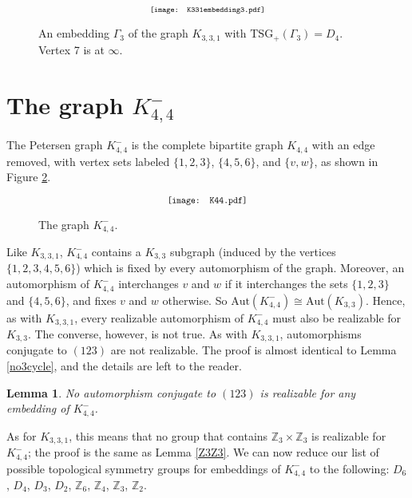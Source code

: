 \documentclass[11]{amsart}
\def\Z{\mathbb{Z}}
\def\TSG{{\mathrm{TSG}}}
\def\Aut{{\mathrm{Aut}}}
\newtheorem{lemma}[theorem]{Lemma}
\theoremstyle{definition}
\theoremstyle{remark}
\begin{document}
    \begin{figure} [htbp]
$$\scalebox{.7}{\texttt{[image: K331embedding3.pdf]}}$$
\caption{An embedding $\Gamma_3$ of the graph $K_{3,3,1}$ with $ \TSG_+(\Gamma_3) = D_4$. Vertex 7 is at $\infty$.}


\label{F:K331D4}
\end{figure}


\section{The graph $K_{4,4}^-$} 
\label{S:K44}


 The Petersen graph $K_{4,4}^-$ is the complete bipartite graph $K_{4,4}$ with an edge removed, with vertex sets labeled $\{1,2,3\}$, $\{4,5,6\}$, and $\{v,w\}$, as shown in Figure \ref{F:K44}.  
 
 \begin{figure} [h]
$$\scalebox{.8}{\texttt{[image: K44.pdf]}}$$
\caption{The graph $K_{4,4}^-$.}
\label{F:K44}
\end{figure}
 

Like $K_{3,3,1}$, $K_{4,4}^-$ contains a $K_{3,3}$ subgraph (induced by the vertices $\{1, 2, 3, 4, 5, 6\}$) which is fixed by every automorphism of the graph.  Moreover, an automorphism of $K_{4,4}^-$ interchanges $v$ and $w$ if it interchanges the sets $\{1, 2, 3\}$ and $\{4, 5, 6\}$, and fixes $v$ and $w$ otherwise.  So $\Aut(K_{4,4}^-) \cong \Aut(K_{3,3})$. Hence, as with $K_{3,3,1}$, every realizable automorphism of $K_{4,4}^-$ must also be realizable for $K_{3,3}$.  The converse, however, is not true. As with $K_{3,3,1}$, automorphisms conjugate to $(123)$ are not realizable.  The proof is almost identical to Lemma \ref{no3cycle}, and the details are left to the reader.
 
\begin{lemma}
\label{no3cycle2}
No automorphism conjugate to $(123)$ is realizable for any embedding of $K_{4,4}^-$. 
\end{lemma}

As for $K_{3,3,1}$, this means that no group that contains $\Z_3 \times \Z_3$ is realizable for $K_{4,4}^-$; the proof is the same as Lemma \ref{Z3Z3}.  We can now reduce our list of possible topological symmetry groups for embeddings of $K_{4,4}^-$ to the following: $D_6$, $D_4$, $D_3$, $D_2$, $\mathbb{Z}_6$, $\Z_4$, $\mathbb{Z}_3$,  $\mathbb{Z}_2$. 
\end{document}
